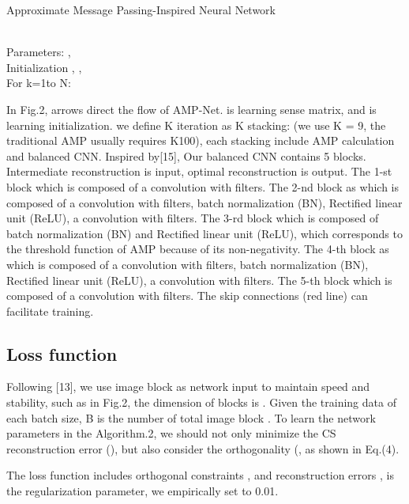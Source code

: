 \documentclass[conference]{IEEEtran}
\begin{document}
\begin{algorithm}
\caption{Approximate Message Passing-Inspired Neural Network}
\label{alg:Approximate Message Passing-Inspired Neural Network}
\begin{algorithmic}
\REQUIRE 
\ENSURE 
\\Parameters: , 
\\Initialization
\STATE , 
\STATE ,
\\For k=1to N:  
       \STATE 
       \STATE 
        \STATE 
        \\

\end{algorithmic}
\end{algorithm}
In Fig.2, arrows direct the flow of AMP-Net.  is learning sense matrix, and   is learning initialization.
we define K iteration as K stacking: (we use K = 9, the traditional AMP usually requires K100), each stacking include AMP calculation and balanced CNN. Inspired by[15], Our balanced CNN contains 5 blocks. Intermediate reconstruction  is input, optimal reconstruction  is output. The 1-st block which is composed of a convolution with  filters. The 2-nd block as  which is composed of a convolution with  filters, batch normalization (BN), Rectified linear unit (ReLU), a convolution with filters. The 3-rd block which is composed of batch normalization (BN) and Rectified linear unit (ReLU), which corresponds to the threshold function  of AMP because of its non-negativity. The 4-th block as   which is composed of a convolution with  filters, batch normalization (BN), Rectified linear unit (ReLU), a convolution with  filters. The 5-th block which is composed of a convolution with  filters. The skip connections (red line) can facilitate training. 

\subsection{Loss function}
Following [13], we use image block as network input to maintain speed and stability, such as in Fig.2, the dimension of blocks is . Given the training data  of each batch size, B is the number of total image block  . To learn the network parameters  in the Algorithm.2, we should not only minimize the CS reconstruction error (), but also consider the orthogonality (, as shown in Eq.(4).

The loss function includes orthogonal constraints , and reconstruction errors ,  is the regularization parameter, we empirically set   to 0.01.
\end{document}
